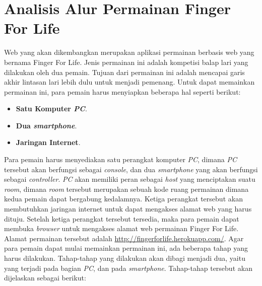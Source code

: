 \section{Analisis Alur Permainan Finger For Life}
\label{sec:alur}

Web yang akan dikembangkan merupakan aplikasi permainan berbasis web yang bernama Finger For Life. Jenis permainan ini adalah kompetisi balap lari yang dilakukan oleh dua pemain. Tujuan dari permainan ini adalah mencapai garis akhir lintasan lari lebih dulu untuk menjadi pemenang. Untuk dapat memainkan permainan ini, para pemain harus menyiapkan beberapa hal seperti berikut:

\begin{itemize}
	\item \textbf{Satu Komputer \textit{PC}}.
	\item \textbf{Dua \textit{smartphone}}.
	\item \textbf{Jaringan Internet}.
\end{itemize}

Para pemain harus menyediakan satu perangkat komputer \textit{PC}, dimana \textit{PC} tersebut akan berfungsi sebagai \textit{console}, dan dua \textit{smartphone} yang akan berfungsi sebagai \textit{controller}. \textit{PC} akan memiliki peran sebagai \textit{host} yang menciptakan suatu \textit{room}, dimana \textit{room} tersebut merupakan sebuah kode ruang permainan dimana kedua pemain dapat bergabung kedalamnya. Ketiga perangkat tersebut akan membutuhkan jaringan internet untuk dapat mengakses alamat web yang harus dituju. Setelah ketiga perangkat tersebut tersedia, maka para pemain dapat membuka \textit{browser} untuk mengakses alamat web permainan Finger For Life. Alamat permainan tersebut adalah \url{http://fingerforlife.herokuapp.com/}. Agar para pemain dapat mulai memainkan permainan ini, ada beberapa tahap yang harus dilakukan. Tahap-tahap yang dilakukan akan dibagi menjadi dua, yaitu yang terjadi pada bagian \textit{PC}, dan pada \textit{smartphone}. Tahap-tahap tersebut akan dijelaskan sebagai berikut:

